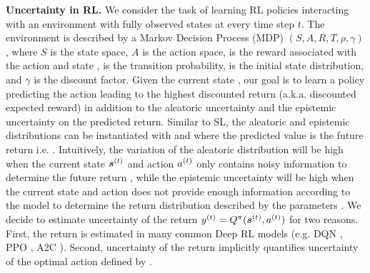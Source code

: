 \textbf{Uncertainty in RL.} We consider the task of learning RL policies interacting with an environment with fully observed states at every time step $t$. The environment is described by a Markov Decision Process (MDP) $(S, A, R, T, \rho, \gamma)$, where $S$ is the state space, $A$ is the action space,  is the reward associated with the action  and state \smash{$\s\datatx$},  is the transition probability,  is the initial state distribution, and $\gamma$ is the discount factor. Given the current state \smash{$\s\datatx$}, our goal is to learn a policy predicting the action  leading to the highest discounted return  (a.k.a. discounted expected reward) in addition to the aleatoric uncertainty  and the epistemic uncertainty  on the predicted return. Similar to SL, the aleatoric and epistemic distributions can be instantiated with \smash{$\prob(\y\datatx \mid \expparam\datatx)$} and \smash{$\prior(\expparam\datatx \mid \priorparam\datatx)$} where the predicted value is the future return i.e. . Intuitively, the variation of the aleatoric distribution will be high when the current state $\s\datatx$ and action $a^{(t)}$ only contains noisy information to determine the future return \smash{$\y\datatx$}, while the epistemic uncertainty will be high when the current state \smash{$\s\datatx$} and action  does not provide enough information according to the model to determine the return distribution \smash{$\prior(\expparam\datatx \mid \priorparam\datatx)$} described by the parameters \smash{$\priorparam\datatx$}.  We decide to estimate uncertainty of the return $y^{(t)}=Q^{\operatorname{\pi}}(\bm{s}^{(t)}, a^{(t)})$ for two reasons. First, the return is estimated in many common Deep RL models (e.g. DQN \citep{dqn}, PPO \citep{ppo}, A2C \citep{a2c}). Second, uncertainty of the return implicitly quantifies uncertainty of the optimal action defined by . 

